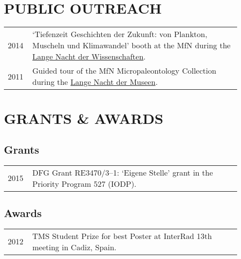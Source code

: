 \documentclass[11pt, a4paper]{article}
\begin{document}
\section{PUBLIC OUTREACH}
\begin{longtable}{p{0.1\linewidth} P{0.85\linewidth}}
2014 & `Tiefenzeit Geschichten der Zukunft: von Plankton, Muscheln und Klimawandel' booth at the MfN during the \href{http://www.langenachtderwissenschaften.de/}{Lange Nacht der Wissenschaften}.\\
2011 & Guided tour of the MfN Micropaleontology Collection during the \href{http://www.lange-nacht-der-museen.de/}{Lange Nacht der Museen}.\\
\end{longtable}


\section{GRANTS \& AWARDS}
\subsection{Grants}
\begin{longtable}{p{0.1\linewidth} P{0.85\linewidth}}
2015 & DFG Grant RE3470/3--1: `Eigene Stelle' grant in the Priority Program 527 (IODP).\\
\end{longtable}
\subsection{Awards}
\begin{longtable}{p{0.1\linewidth} P{0.85\linewidth}}
2012 & TMS Student Prize for best Poster at InterRad 13th meeting in Cadiz, Spain.\\
\end{longtable}
\end{document}
